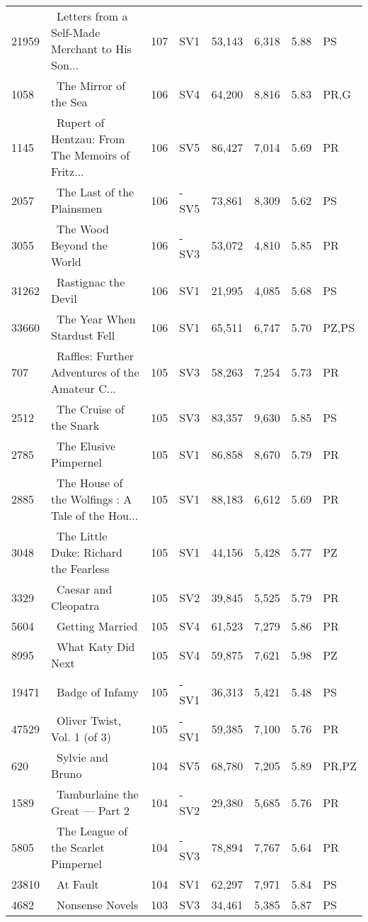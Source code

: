 \begin{longtable}{l | l | l | l | l | l | l | l}
21959 & ~Letters from a Self-Made Merchant to His Son... & 107 & SV1 & 53,143 & 6,318 & 5.88 & PS\\
1058 & ~The Mirror of the Sea & 106 & SV4 & 64,200 & 8,816 & 5.83 & PR,G\\
1145 & ~Rupert of Hentzau: From The Memoirs of Fritz... & 106 & SV5 & 86,427 & 7,014 & 5.69 & PR\\
2057 & ~The Last of the Plainsmen & 106 & -SV5 & 73,861 & 8,309 & 5.62 & PS\\
3055 & ~The Wood Beyond the World & 106 & -SV3 & 53,072 & 4,810 & 5.85 & PR\\
31262 & ~Rastignac the Devil & 106 & SV1 & 21,995 & 4,085 & 5.68 & PS\\
33660 & ~The Year When Stardust Fell & 106 & SV1 & 65,511 & 6,747 & 5.70 & PZ,PS\\
707 & ~Raffles: Further Adventures of the Amateur C... & 105 & SV3 & 58,263 & 7,254 & 5.73 & PR\\
2512 & ~The Cruise of the Snark & 105 & SV3 & 83,357 & 9,630 & 5.85 & PS\\
2785 & ~The Elusive Pimpernel & 105 & SV1 & 86,858 & 8,670 & 5.79 & PR\\
2885 & ~The House of the Wolfings
: A Tale of the Hou... & 105 & SV1 & 88,183 & 6,612 & 5.69 & PR\\
3048 & ~The Little Duke: Richard the Fearless & 105 & SV1 & 44,156 & 5,428 & 5.77 & PZ\\
3329 & ~Caesar and Cleopatra & 105 & SV2 & 39,845 & 5,525 & 5.79 & PR\\
5604 & ~Getting Married & 105 & SV4 & 61,523 & 7,279 & 5.86 & PR\\
8995 & ~What Katy Did Next & 105 & SV4 & 59,875 & 7,621 & 5.98 & PZ\\
19471 & ~Badge of Infamy & 105 & -SV1 & 36,313 & 5,421 & 5.48 & PS\\
47529 & ~Oliver Twist, Vol. 1 (of 3) & 105 & -SV1 & 59,385 & 7,100 & 5.76 & PR\\
620 & ~Sylvie and Bruno & 104 & SV5 & 68,780 & 7,205 & 5.89 & PR,PZ\\
1589 & ~Tamburlaine the Great — Part 2 & 104 & -SV2 & 29,380 & 5,685 & 5.76 & PR\\
5805 & ~The League of the Scarlet Pimpernel & 104 & -SV3 & 78,894 & 7,767 & 5.64 & PR\\
23810 & ~At Fault & 104 & SV1 & 62,297 & 7,971 & 5.84 & PS\\
4682 & ~Nonsense Novels & 103 & SV3 & 34,461 & 5,385 & 5.87 & PS\\

\end{longtable}
